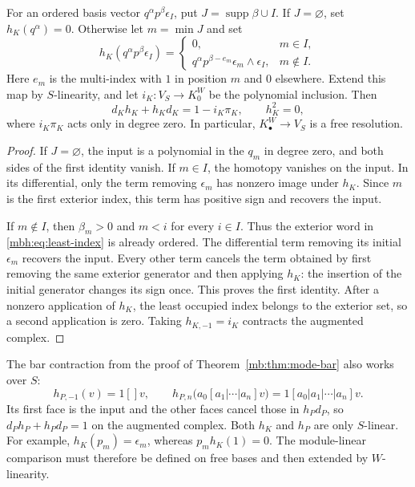 \begin{lemma}
\label{mbh:lem:integral-contraction}
For an ordered basis vector \(q^\alpha p^\beta\epsilon_I\),
put \(J=\operatorname{supp}\beta\cup I\).
If \(J=\varnothing\), set \(h_K(q^\alpha)=0\).
Otherwise let \(m=\min J\) and set
\begin{equation}\label{mbh:eq:least-index}
 h_K(q^\alpha p^\beta\epsilon_I)=
 \begin{cases}
 0,&m\in I,\\
 q^\alpha p^{\beta-e_m}\epsilon_m\wedge\epsilon_I,&m\notin I.
 \end{cases}
\end{equation}
Here \(e_m\) is the multi-index with \(1\) in position \(m\)
and \(0\) elsewhere.  Extend this map by \(S\)-linearity, and let
\(i_K:V_S\to K^W_0\) be the polynomial inclusion.  Then
\begin{equation}\label{mbh:eq:koszul-contraction}
 d_Kh_K+h_Kd_K=1-i_K\pi_K,\qquad h_K^2=0,
\end{equation}
where \(i_K\pi_K\) acts only in degree zero.  In particular,
\(K^W_\bullet\to V_S\) is a free resolution.
\end{lemma}

\begin{proof}
If \(J=\varnothing\), the input is a polynomial in the \(q_m\)
in degree zero, and both sides of the first identity vanish.
If \(m\in I\), the homotopy vanishes on the input.  In its
differential, only the term removing \(\epsilon_m\) has nonzero
image under \(h_K\).  Since \(m\) is the first exterior index,
this term has positive sign and recovers the input.

If \(m\notin I\), then \(\beta_m>0\) and \(m<i\) for every
\(i\in I\).  Thus the exterior word in
\eqref{mbh:eq:least-index} is already ordered.  The differential
term removing its initial \(\epsilon_m\) recovers the input.
Every other term cancels the term obtained by first removing the
same exterior generator and then applying \(h_K\): the insertion
of the initial generator changes its sign once.  This proves the
first identity.  After a nonzero application of \(h_K\), the least
occupied index belongs to the exterior set, so a second application
is zero.  Taking \(h_{K,-1}=i_K\) contracts the augmented complex.
\end{proof}

The bar contraction from the proof of
Theorem~\ref{mb:thm:mode-bar} also works over \(S\):
\begin{equation}\label{mbh:eq:bar-contraction}
 h_{P,-1}(v)=1[]v,\qquad
 h_{P,n}\bigl(a_0[a_1|\cdots|a_n]v\bigr)
       =1[a_0|a_1|\cdots|a_n]v.
\end{equation}
Its first face is the input and the other faces cancel those in
\(h_Pd_P\), so \(d_Ph_P+h_Pd_P=1\) on the augmented complex.
Both \(h_K\) and \(h_P\) are only \(S\)-linear.
For example, \(h_K(p_m)=\epsilon_m\), whereas
\(p_mh_K(1)=0\).  The module-linear comparison must therefore be
defined on free bases and then extended by \(W\)-linearity.

